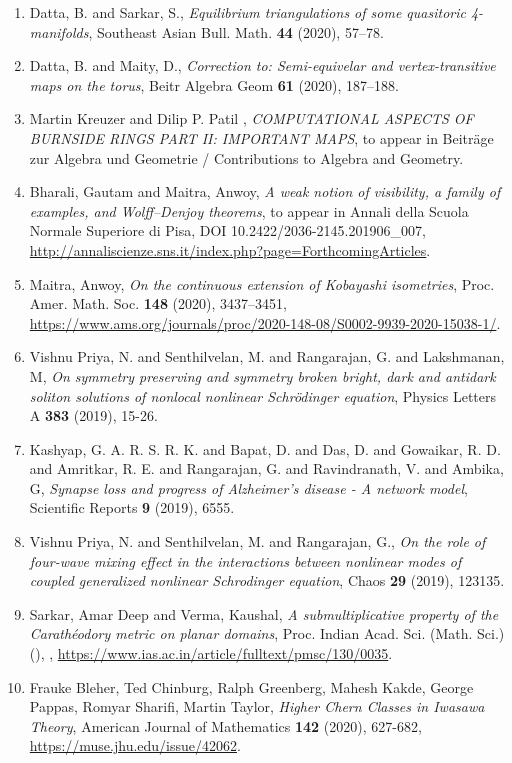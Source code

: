 \begin{enumerate}
\item Datta, B. and Sarkar, S., \emph{Equilibrium triangulations of some quasitoric 4-manifolds}, Southeast Asian Bull. Math. {\bf 44} (2020), 57--78.
\item Datta, B. and Maity, D., \emph{Correction to: Semi-equivelar and vertex-transitive maps on the torus}, Beitr Algebra Geom {\bf 61} (2020), 187--188.
\item Martin Kreuzer and Dilip P. Patil , \emph{COMPUTATIONAL ASPECTS OF BURNSIDE RINGS PART II: IMPORTANT MAPS}, to appear in Beiträge zur Algebra und Geometrie / Contributions to Algebra and Geometry.
\item Bharali, Gautam and Maitra, Anwoy, \emph{A weak notion of visibility, a family of examples, and Wolff--Denjoy theorems}, to appear in Annali della Scuola Normale Superiore di Pisa, DOI 10.2422/2036-2145.201906\_007, \url{http://annaliscienze.sns.it/index.php?page=ForthcomingArticles}.
\item Maitra, Anwoy, \emph{On the continuous extension of Kobayashi isometries}, Proc. Amer. Math. Soc. {\bf 148} (2020), 3437--3451, \url{https://www.ams.org/journals/proc/2020-148-08/S0002-9939-2020-15038-1/}.
\item Vishnu Priya, N. and Senthilvelan, M. and  Rangarajan, G. and Lakshmanan, M, \emph{On symmetry preserving and symmetry broken bright, dark and antidark soliton solutions of nonlocal nonlinear Schrödinger equation}, Physics Letters A {\bf 383} (2019), 15-26.
\item Kashyap, G. A. R. S. R. K. and Bapat, D. and Das, D. and Gowaikar, R. D. and Amritkar, R. E. and Rangarajan, G. and Ravindranath, V. and Ambika, G, \emph{Synapse loss and progress of Alzheimer’s disease - A network model}, Scientific Reports {\bf 9} (2019), 6555.
\item Vishnu Priya, N. and Senthilvelan, M. and Rangarajan, G., \emph{On the role of four-wave mixing effect in the interactions between nonlinear modes of coupled generalized nonlinear Schrodinger equation}, Chaos {\bf 29} (2019), 123135.
\item Sarkar, Amar Deep and Verma, Kaushal, \emph{A submultiplicative property of the Carath\'{e}odory metric on planar domains}, Proc. Indian Acad. Sci. (Math. Sci.) {\bf } (), , \url{https://www.ias.ac.in/article/fulltext/pmsc/130/0035}.
\item Frauke Bleher, Ted Chinburg, Ralph Greenberg, Mahesh Kakde, George Pappas, Romyar Sharifi, Martin Taylor, \emph{Higher Chern Classes in Iwasawa Theory}, American Journal of Mathematics {\bf 142} (2020), 627-682, \url{https://muse.jhu.edu/issue/42062}.

\end{enumerate}
